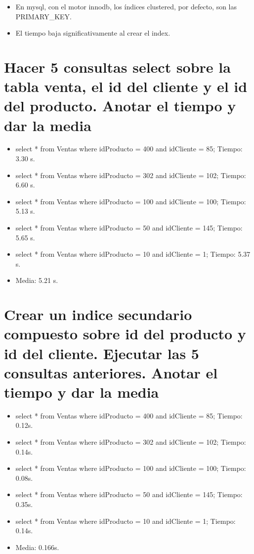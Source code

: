 \documentclass[a4paper,12pt]{article}
\begin{document}
  \begin{itemize}
   \item En mysql, con el motor innodb, los índices clustered, por defecto, son las PRIMARY\_KEY.
   \item El tiempo baja significativamente al crear el index.
  \end{itemize}
  
  \section{Hacer 5 consultas select sobre la tabla venta, el id del cliente y el id del producto. Anotar el tiempo y dar la media}
  
  \begin{itemize}
   \item select * from Ventas where idProducto = 400 and idCliente = 85; Tiempo: 3.30 s.
   \item select * from Ventas where idProducto = 302 and idCliente = 102; Tiempo: 6.60 s.
   \item select * from Ventas where idProducto = 100 and idCliente = 100; Tiempo: 5.13 s.
   \item select * from Ventas where idProducto = 50 and idCliente = 145; Tiempo: 5.65 s.
   \item select * from Ventas where idProducto = 10 and idCliente = 1; Tiempo: 5.37 s.
   \item Media: 5.21 s.
  \end{itemize}

  \section{Crear un indice secundario compuesto sobre id del producto y id del cliente.
  Ejecutar las 5 consultas anteriores. Anotar el tiempo y dar la media}
  
  \begin{itemize}
   \item select * from Ventas where idProducto = 400 and idCliente = 85; Tiempo: 0.12s.
   \item select * from Ventas where idProducto = 302 and idCliente = 102; Tiempo: 0.14s.
   \item select * from Ventas where idProducto = 100 and idCliente = 100; Tiempo: 0.08s.
   \item select * from Ventas where idProducto = 50 and idCliente = 145; Tiempo: 0.35s.
   \item select * from Ventas where idProducto = 10 and idCliente = 1; Tiempo: 0.14s.
   \item Media: 0.166s.
  \end{itemize}
  
\end{document}
